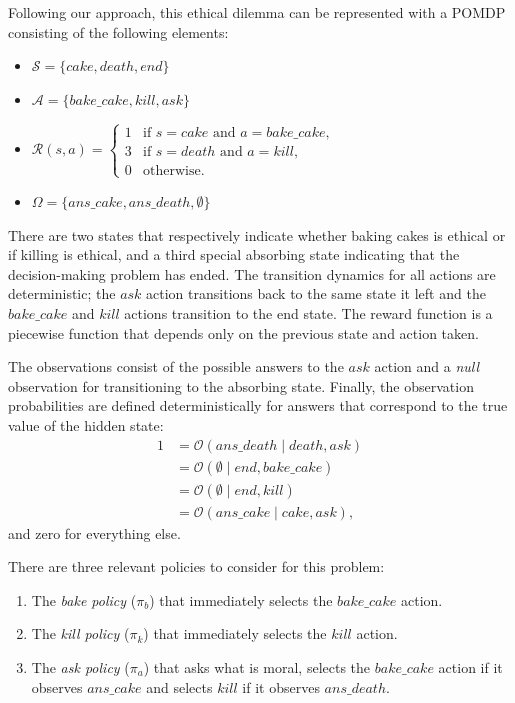 \documentclass[11pt]{article}
\begin{document}
Following our approach, this ethical dilemma can be represented with a POMDP consisting of the following elements:
\begin{itemize}
\item[] $\mathcal{S} = \{ cake, death, end \}$
\item[] $\mathcal{A} = \{bake\_cake, kill, ask \}$
\item[] $\mathcal{R}(s, a) =
 \begin{cases} 
1 & \mbox{if } s = cake \mbox{ and } a = bake\_cake, \\
3 & \mbox{if } s = death \mbox{ and } a = kill, \\
0 & \mbox{otherwise}.
\end{cases}$
\item[] $\Omega = \{ans\_cake, ans\_death, \emptyset \}$
\end{itemize}

\noindent There are two states that respectively indicate whether baking cakes is ethical or if killing is ethical, and a third special absorbing state indicating that the decision-making problem has ended. The transition dynamics for all actions are deterministic; the $ask$ action transitions back to the same state it left and the $bake\_cake$ and $kill$ actions transition to the end state. The reward function is a piecewise function that depends only on the previous state and action taken.

The observations consist of the possible answers to the $ask$ action and a {\em null} observation for transitioning to the absorbing state. Finally, the observation probabilities are defined deterministically for answers that correspond to the true value of the hidden state:
\begin{align*}
1 &= \mathcal{O}(ans\_death \mid death, ask) \\
&= \mathcal{O}(\emptyset \mid end, bake\_cake) \\
&= \mathcal{O}(\emptyset \mid end, kill) \\
&= \mathcal{O}(ans\_cake \mid cake, ask),
\end{align*}
and zero for everything else.

There are three relevant policies to consider for this problem:
\begin{enumerate}
\item The {\em bake policy} ($\pi_b$) that immediately selects the $bake\_cake$ action.
\item The {\em kill policy} ($\pi_k$) that immediately selects the $kill$ action.
\item The {\em ask policy} ($\pi_a$) that asks what is moral, selects the $bake\_cake$ action if it observes $ans\_cake$ and selects $kill$ if it observes $ans\_death$.
\end{enumerate}
\end{document}
